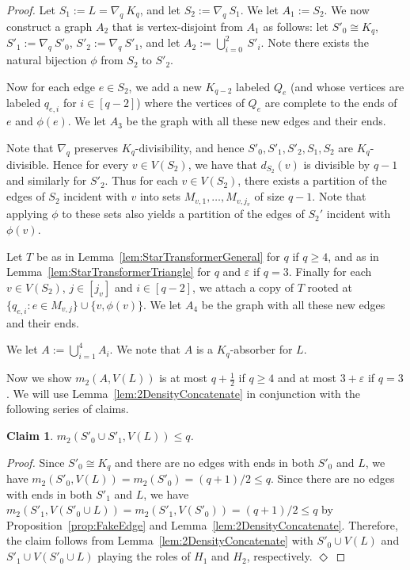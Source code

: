 \documentclass[11pt]{article}
\numberwithin{equation}{section}
\newcommand{\eps}{\varepsilon}
\newcounter{i}
\theoremstyle{plain}
\newtheorem{claim}{Claim}[thm]
\newenvironment{proofclaim}[1][]%
{\noindent \emph{Proof.} {}{#1}{}}{\hfill
	$\Diamond$\vspace{1em}}
\theoremstyle{plain} %
\theoremstyle{definition}
\begin{document}
\begin{proof}
Let $S_1:= L = \nabla_q~K_q$, and let $S_2:= \nabla_q~S_1$. We let $A_1:= S_2$. We now construct a graph $A_2$ that is vertex-disjoint from $A_1$ as follows: let $S'_0\cong K_q$, $S'_1:= \nabla_q~S'_0$, $S'_2 := \nabla_q~S'_1$, and let $A_2 := \bigcup_{i=0}^{2}~S'_i$.
Note there exists the natural bijection $\phi$ from $S_2$ to $S'_2$.

Now for each edge $e\in S_{2}$, we add a new $K_{q-2}$ labeled $Q_e$ (and whose vertices are labeled $q_{e,i}$ for $i\in [q-2]$) where the vertices of $Q_e$ are complete to the ends of $e$ and $\phi(e)$. We let $A_3$ be the graph with all these new edges and their ends.

Note that $\nabla_q$ preserves $K_q$-divisibility, and hence $S'_0,S'_1,S'_2,S_1,S_2$ are $K_q$-divisible. Hence for every $v\in V(S_2)$, we have that $d_{S_2}(v)$ is divisible by $q-1$ and similarly for $S'_{2}$. Thus for each $v\in V(S_2)$, there exists a partition of the edges of $S_{2}$ incident with $v$ into sets $M_{v,1},\ldots, M_{v,j_v}$ of size $q-1$. Note that applying $\phi$ to these sets also yields a partition of the edges of $S_2'$ incident with $\phi(v)$.

Let $T$ be as in Lemma~\ref{lem:StarTransformerGeneral} for $q$ if $q\ge 4$, and as in Lemma~\ref{lem:StarTransformerTriangle} for $q$ and $\varepsilon$ if $q=3$. Finally for each $v\in V(S_2)$, $j\in [j_v]$ and $i\in [q-2]$, we attach a copy of $T$ rooted at $\{ q_{e,i}: e\in M_{v,j}\}\cup \{v,\phi(v)\}$.
We let $A_4$ be the graph with all these new edges and their ends.

We let $A := \bigcup_{i=1}^4 A_i$. We note that $A$ is a $K_q$-absorber for $L$. %

Now we show $m_2(A, V(L))$ is at most $q + \frac{1}{2}$ if $q \geq 4$ and at most $3 + \eps$ if $q = 3$.  We will use Lemma~\ref{lem:2DensityConcatenate} in conjunction with the following series of claims.

\begin{claim}\label{cl:S'_0andS'_1}
    $m_2(S'_0 \cup S'_1, V(L)) \leq q$.
\end{claim}
\begin{proofclaim}
    Since $S'_0 \cong K_q$ and there are no edges with ends in both $S'_0$ and $L$, we have $m_2(S'_0, V(L)) = m_2(S'_0) = (q + 1)/2 \leq q$.
    Since there are no edges with ends in both $S'_1$ and $L$, we have $m_2(S'_1, V(S'_0 \cup L)) = m_2(S'_1, V(S'_0)) = (q + 1)/2 \leq q$ by Proposition~\ref{prop:FakeEdge} and Lemma~\ref{lem:2DensityConcatenate}.
    Therefore, the claim follows from Lemma~\ref{lem:2DensityConcatenate} with $S'_0 \cup V(L)$ and $S'_1 \cup V(S'_0 \cup L)$ playing the roles of $H_1$ and $H_2$, respectively.
\end{proofclaim}


\end{proof}
\end{document}
